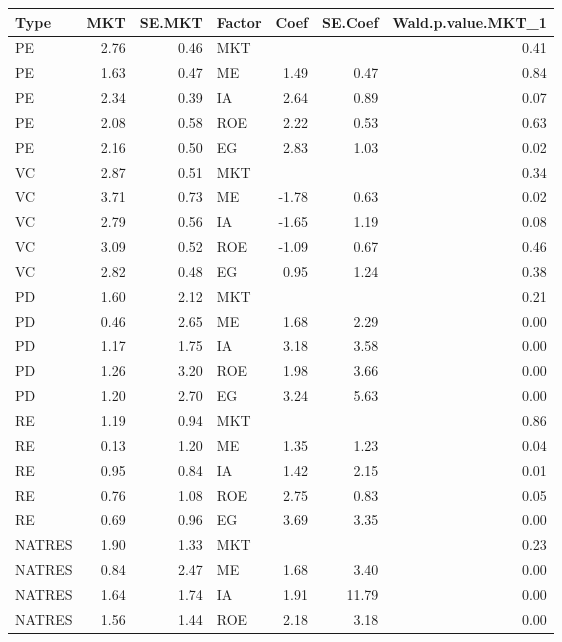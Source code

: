 \documentclass[12pt]{article}
\begin{document}



\begin{table}[ht]
	\centering
	\begin{tabular}{lrrlrrr}
		Type & MKT & SE.MKT & Factor & Coef & SE.Coef & Wald.p.value.MKT\_1 \\ 
		\hline
		\hline
		PE & 2.76 & 0.46 & MKT &  &  & 0.41 \\ 
		PE & 1.63 & 0.47 & ME & 1.49 & 0.47 & 0.84 \\ 
		PE & 2.34 & 0.39 & IA & 2.64 & 0.89 & 0.07 \\ 
		PE & 2.08 & 0.58 & ROE & 2.22 & 0.53 & 0.63 \\ 
		PE & 2.16 & 0.50 & EG & 2.83 & 1.03 & 0.02 \\ 
		\hline
		VC & 2.87 & 0.51 & MKT &  &  & 0.34 \\ 
		VC & 3.71 & 0.73 & ME & -1.78 & 0.63 & 0.02 \\ 
		VC & 2.79 & 0.56 & IA & -1.65 & 1.19 & 0.08 \\ 
		VC & 3.09 & 0.52 & ROE & -1.09 & 0.67 & 0.46 \\ 
		VC & 2.82 & 0.48 & EG & 0.95 & 1.24 & 0.38 \\ 
		\hline
		PD & 1.60 & 2.12 & MKT &  &  & 0.21 \\ 
		PD & 0.46 & 2.65 & ME & 1.68 & 2.29 & 0.00 \\ 
		PD & 1.17 & 1.75 & IA & 3.18 & 3.58 & 0.00 \\ 
		PD & 1.26 & 3.20 & ROE & 1.98 & 3.66 & 0.00 \\ 
		PD & 1.20 & 2.70 & EG & 3.24 & 5.63 & 0.00 \\ 
		\hline
		RE & 1.19 & 0.94 & MKT &  &  & 0.86 \\ 
		RE & 0.13 & 1.20 & ME & 1.35 & 1.23 & 0.04 \\ 
		RE & 0.95 & 0.84 & IA & 1.42 & 2.15 & 0.01 \\ 
		RE & 0.76 & 1.08 & ROE & 2.75 & 0.83 & 0.05 \\ 
		RE & 0.69 & 0.96 & EG & 3.69 & 3.35 & 0.00 \\ 
		\hline
		NATRES & 1.90 & 1.33 & MKT &  &  & 0.23 \\ 
		NATRES & 0.84 & 2.47 & ME & 1.68 & 3.40 & 0.00 \\ 
		NATRES & 1.64 & 1.74 & IA & 1.91 & 11.79 & 0.00 \\ 
		NATRES & 1.56 & 1.44 & ROE & 2.18 & 3.18 & 0.00 \\ 

\end{tabular}
\end{table}
\end{document}
